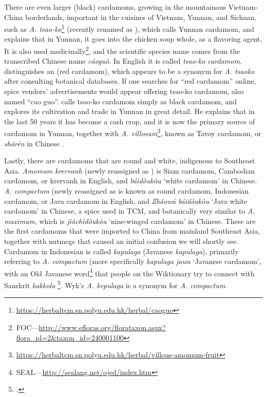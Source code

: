 There are even larger (black) cardamoms, growing in the mountainous Vietnam-China borderlands, important in the cuisines of Vietnam, Yunnan, and Sichuan, such as \textit{A. tsao-ko}\footnote{\url{https://herbaltcm.sn.polyu.edu.hk/herbal/caoguo}} (recently renamed as ), which \textcite[326]{hu_food_2005} calls Yunnan cardamom, and explains that in Yunnan, it goes into the chicken soup whole, as a flavoring agent. It is also used medicinally\footnote{\gls{FOC}---\url{http://www.efloras.org/florataxon.aspx?flora_id=2&taxon_id=240001100}}, and the scientific species name comes from the transcribed Chinese name  \textit{cǎoguǒ}. In English it is called \textit{tsao-ko cardamom}. \textcite[326]{hu_food_2005} distinguishes an  (red cardamom), which appears to be a synonym for \textit{A. tsaoko} after consulting botanical databases. If one searches for ``red cardamom'' online, spice vendors' advertisements would appear offering tsao-ko cardamom, also named ``cao guo''. \textcite{putzel_spice_2017} calls tsao-ko cardamom simply as black cardamom, and explores its cultivation and trade in Yunnan in great detail. He explains that in the last 50 years it has become a cash crop, and it is now the primary source of cardamom in Yunnan, together with \textit{A. villosum}\footnote{\url{https://herbaltcm.sn.polyu.edu.hk/herbal/villous-amomum-fruit}}, known as Tavoy cardamom, or  \textit{shārén} in Chinese \autocite[41]{putzel_spice_2017}.

Lastly, there are cardamoms that are round and white, indigenous to Southeast Asia. \textit{Amomum krervanh} (newly reassigned as ) is Siam cardamom, Cambodian cardamom, or krervanh in English, and  \textit{báidòukòu} `white cardamom' in Chinese. \textit{A. compactum} (newly reassigned as  is known as round cardamom, Indonesian cardamom, or Java cardamom in English, and  \textit{Zhǎowā báidòukòu} `Java white cardamom' in Chinese, a spice used in \gls{TCM}, and botanically very similar to \textit{A. maximum}, which is  \textit{jiǔchìdòukòu} `nine-winged cardamom' in Chinese. These are the first cardamoms that were imported to China from mainland Southeast Asia, together with nutmegs that caused an initial confusion we will shortly see. Cardamom in Indonesian is called \textit{kapulaga} (Javanese  
\textit{kapulaga}), primarily referring to \textit{A. compactum} (more specifically \textit{kapulaga jawa} `Javanese cardamom', with an Old Javanese word\footnote{\gls{SEAL}---\url{http://sealang.net/ojed/index.htm}} that people on the Wiktionary try to connect with Sanskrit  \textit{kakkola} \footcite[241. ]{monier-williams_sanskrit-english_1899}. Wyk's \textit{A. kepulaga} is a synonym for \textit{A. compactum}.

